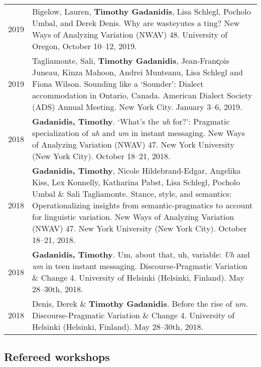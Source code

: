\documentclass[letterpaper]{article}
\begin{document}
\begin{longtable}{p{}p{}}
    2019 & Bigelow, Lauren, \textbf{Timothy Gadanidis}, Lisa Schlegl, Pocholo
    Umbal, and Derek Denis. Why are wasteyutes a ting? New Ways of Analyzing
    Variation (NWAV) 48. University of Oregon, October 10--12, 2019. \\
    2019 & Tagliamonte, Sali, \textbf{Timothy Gadanidis}, Jean-Fran\k{c}ois
    Juneau, Kinza Mahoon, Andrei Munteanu, Lisa Schlegl and Fiona Wilson.
    Sounding like a `Sounder': Dialect accommodation in Ontario, Canada.
    American Dialect Society (ADS) Annual Meeting. New York City. January 3--6,
    2019. \\
    2018 & \textbf{Gadanidis, Timothy}.  `What’s the \emph{uh} for?': Pragmatic
    specialization of \emph{uh} and \emph{um} in instant messaging.  New Ways of
    Analyzing Variation (NWAV) 47.  New York University (New York City). October
    18--21, 2018. \\
    2018 & \textbf{Gadanidis, Timothy}, Nicole Hildebrand-Edgar, Angelika Kiss,
    Lex Konnelly, Katharina Pabst, Lisa Schlegl, Poc\-holo Umbal \& Sali
    Tagliamonte.  Stance, style, and semantics: Operationalizing insights from
    seman\-tic-pragmatics to account for linguistic variation.  New Ways of
    Analyzing Variation (NWAV) 47. New York University (New York City). October
    18--21, 2018. \\
    2018 & \textbf{Gadanidis, Timothy}.  Um, about that, uh, variable: \emph{Uh}
    and \emph{um} in teen instant messaging.  Discourse-Pragmatic Variation \&
    Change 4. University of Helsinki (Helsinki, Finland). May 28--30th, 2018. \\
    2018 & Denis, Derek \& \textbf{Timothy Gadanidis}.  Before the rise of
    \emph{um}.  Discourse-Pragmatic Variation \& Change 4. University of
    Helsinki (Helsinki, Finland). May 28--30th, 2018. \\
\end{longtable}

\subsection*{Refereed workshops}
\end{document}
